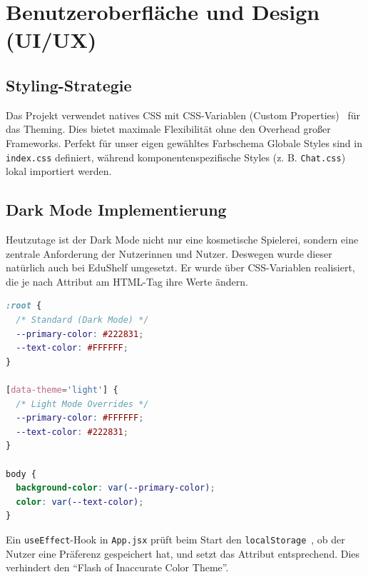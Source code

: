 \section{Benutzeroberfläche und Design (UI/UX)}
\subsection{Styling-Strategie}
Das Projekt verwendet natives CSS mit CSS-Variablen (Custom Properties)~\cite{MDNCSSCustomProperties} für das Theming. Dies bietet maximale Flexibilität ohne den Overhead großer Frameworks. Perfekt für unser eigen gewähltes Farbschema
Globale Styles sind in \texttt{index.css} definiert, während komponentenspezifische Styles (z. B. \texttt{Chat.css}) lokal importiert werden.

\subsection{Dark Mode Implementierung}
Heutzutage ist der Dark Mode nicht nur eine kosmetische Spielerei, sondern eine zentrale Anforderung der Nutzerinnen und Nutzer. Deswegen wurde dieser natürlich auch bei EduShelf umgesetzt. Er wurde über CSS-Variablen realisiert, die je nach Attribut am HTML-Tag ihre Werte ändern.

\begin{lstlisting}[language=CSS, caption={Theme-Switching mittels CSS-Variablen}]
:root {
  /* Standard (Dark Mode) */
  --primary-color: #222831;
  --text-color: #FFFFFF;
}

[data-theme='light'] {
  /* Light Mode Overrides */
  --primary-color: #FFFFFF;
  --text-color: #222831;
}

body {
  background-color: var(--primary-color);
  color: var(--text-color);
}
\end{lstlisting}

Ein \texttt{useEffect}-Hook in \texttt{App.jsx} prüft beim Start den \texttt{localStorage}~\cite{MDNLocalStorage}, ob der Nutzer eine Präferenz gespeichert hat, und setzt das Attribut entsprechend. Dies verhindert den "`Flash of Inaccurate Color Theme"'.
